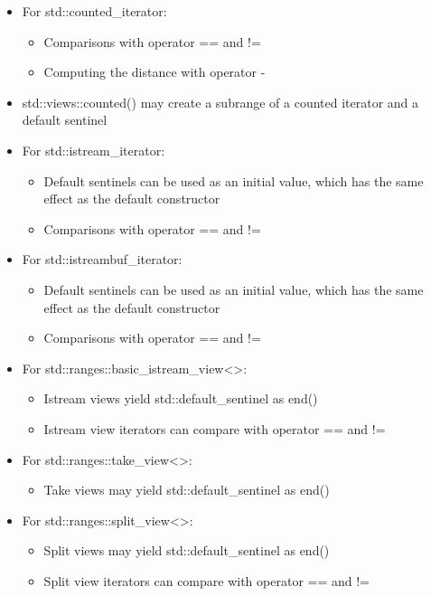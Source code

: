 \begin{itemize}
\item
For std::counted\_iterator:

\begin{itemize}
\item
Comparisons with operator == and !=

\item
Computing the distance with operator -
\end{itemize}

\item
std::views::counted() may create a subrange of a counted iterator and a default sentinel

\item
For std::istream\_iterator:

\begin{itemize}
\item
Default sentinels can be used as an initial value, which has the same effect as the default constructor

\item
Comparisons with operator == and !=
\end{itemize}

\item
For std::istreambuf\_iterator:

\begin{itemize}
\item
Default sentinels can be used as an initial value, which has the same effect as the default constructor

\item
Comparisons with operator == and !=
\end{itemize}

\item
For std::ranges::basic\_istream\_view<>:

\begin{itemize}
\item
Istream views yield std::default\_sentinel as end()

\item
Istream view iterators can compare with operator == and !=
\end{itemize}

\item
For std::ranges::take\_view<>:

\begin{itemize}
\item
Take views may yield std::default\_sentinel as end()
\end{itemize}

\item
For std::ranges::split\_view<>:

\begin{itemize}
\item
Split views may yield std::default\_sentinel as end()

\item
Split view iterators can compare with operator == and !=
\end{itemize}
\end{itemize}

